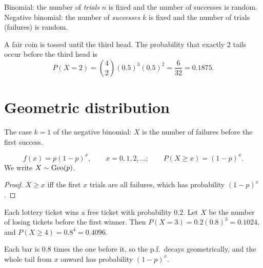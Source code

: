 \begin{important}
Binomial: the number of \emph{trials} $n$ is fixed and the number of successes is random.
Negative binomial: the number of \emph{successes} $k$ is fixed and the number of trials
(failures) is random.
\end{important}

\begin{example}
A fair coin is tossed until the third head. The probability that exactly $2$ tails occur
before the third head is
\[
  P(X=2) = \binom{4}{2}(0.5)^3(0.5)^2 = \frac{6}{32} = 0.1875.
\]
\end{example}

\section{Geometric distribution}

The case $k=1$ of the negative binomial: $X$ is the number of failures before the first
success.

\begin{theorem}[Geometric p.f.]
\[
  f(x) = p(1-p)^x,\qquad x = 0,1,2,\dots; \qquad P(X \ge x) = (1-p)^x.
\]
We write $X\sim\operatorname{Geo}(p)$.
\end{theorem}

\begin{proof}
$X\ge x$ iff the first $x$ trials are all failures, which has probability $(1-p)^x$.
\end{proof}

\begin{example}
Each lottery ticket wins a free ticket with probability $0.2$. Let $X$ be the number of
losing tickets before the first winner. Then $P(X = 3) = 0.2(0.8)^3 = 0.1024$, and
$P(X\ge 4) = 0.8^4 = 0.4096$.
\end{example}

\begin{center}
\end{center}
Each bar is $0.8$ times the one before it, so the p.f.\ decays geometrically, and the whole
tail from $x$ onward has probability $(1-p)^x$.

